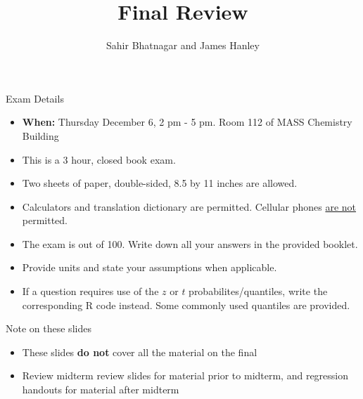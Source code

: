 \documentclass{beamer}\usepackage[]{graphicx}\usepackage[]{color}
\begin{document}




\title{Final Review}
\subtitle{}
\author{Sahir Bhatnagar and James Hanley}


\maketitle


\begin{frame}{Exam Details}

\begin{itemize}
		\setlength\itemsep{.51em}
			\item \textbf{When:} Thursday December 6, 2 pm - 5 pm. Room 112 of MASS Chemistry Building
	\item This is a 3 hour, closed book exam. 
	\item Two sheets of paper, double-sided, 8.5 by 11 inches are allowed.
	\item Calculators and translation dictionary are permitted. Cellular phones \underline{are not} permitted. 
	\item The exam is out of 100. Write down all your answers in the provided booklet. 
	\item Provide units and state your assumptions when applicable. 
	\item If a question requires use of the $z$ or $t$ probabilites/quantiles, write the corresponding R code instead. Some commonly used quantiles are provided. 
\end{itemize}

\end{frame}

\begin{frame}{Note on these slides}
\begin{itemize}
	\setlength\itemsep{1.5em}
	\item These slides \textbf{do not} cover all the material on the final
	\item Review midterm review slides for material prior to midterm, and regression handouts for material after midterm
\end{itemize}
\end{frame}
\end{document}

